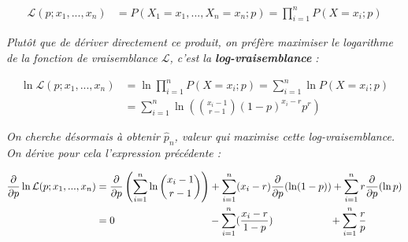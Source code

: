 \documentclass[a4paper,11pt]{article}
\theoremstyle{nonumberplain}
\theoremstyle{nonumberplain}
\theoremstyle{nonumberplain}
\begin{document}
    \begin{calculs}
        \vspace{-2ex}
        \begin{equation*}
        \begin{split}
            \mathcal{L}(p; x_1,...,x_n) & = P(X_1 = x_1, ..., X_n = x_n;p) = \prod\limits_{i = 1}^{n} P(X = x_i; p)
        \end{split}
        \end{equation*}

        \emph{Plutôt que de dériver directement ce produit, on préfère maximiser
        le logarithme de la fonction de vraisemblance $\mathcal{L}$, c'est la \textbf{log-vraisemblance} :}

        \vspace{-2ex}
        \begin{equation*}
        \begin{split}
            \ln \mathcal{L}(p; x_1,...,x_n) & = \ln \prod\limits_{i = 1}^{n} P(X = x_i; p) = \sum\limits_{i = 1}^{n} \ln P(X = x_i; p) \\
                                            & = \sum\limits_{i = 1}^{n} \ln \left(\binom{x_i - 1}{r - 1} (1 - p)^{x_i - r} p^{r} \right)
        \end{split}
        \end{equation*}

        \medskip
        \emph{On cherche désormais à obtenir $\hat{p}_n$, valeur qui maximise
        cette log-vraisemblance. On dérive pour cela l'expression précédente :}

        \vspace{-2ex}
        \begin{equation*}
        \begin{split}
            \frac{\partial}{\partial p} \ln \mathcal{L}(p; x_1,...,x_n) & = \frac{\partial}{\partial p}
                \left( \sum\limits_{i = 1}^{n} \ln \binom{x_i - 1}{r - 1} \right) + \sum\limits_{i = 1}^{n} (x_i - r) \frac{\partial}{\partial p} (\ln(1-p))
                + \sum\limits_{i = 1}^{n} r \frac{\partial}{\partial p} (\ln p)  \\
                & = 0\hspace{21.5ex}- \sum\limits_{i = 1}^{n} (\frac{x_i - r}{1 - p})\hspace{13ex}+ \sum\limits_{i = 1}^{n} \frac{r}{p}
        \end{split}
        \end{equation*}


\end{calculs}
\end{document}
